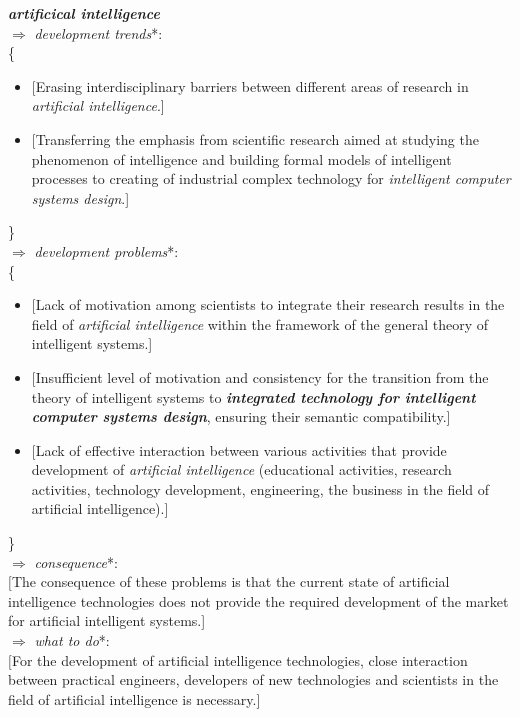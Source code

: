\documentclass[10pt, a4paper]{proc}
\begin{document}
 \noindent\textbf{\textit{artificical intelligence}}\\
 \(\Rightarrow\) \textit{development trends}*:\\
 \{
 \begin{itemize}
  \item \([\)Erasing interdisciplinary barriers between different areas of research in \textit{artificial intelligence}.]
  \item \([\)Transferring the emphasis from scientific research aimed at studying the phenomenon of intelligence and building formal models of intelligent processes to creating of industrial complex technology for \textit{intelligent computer systems design}.]
 \end{itemize}
 \}\\
 \(\Rightarrow\) \textit{development problems}*:\\
 \{
 \begin{itemize}
  \item \([\)Lack of motivation among scientists to integrate their research results in the field of \textit{artificial intelligence} within the framework of the general theory of intelligent systems.]
  \item \([\)Insufficient level of motivation and consistency for the transition from the theory of intelligent systems to \textbf{\textit{integrated technology for intelligent computer systems design}}, ensuring their semantic compatibility.]
  \item \([\)Lack of effective interaction between various activities that provide development of \textit{artificial intelligence} (educational activities, research activities, technology development, engineering, the business in the field of artificial intelligence).]
 \end{itemize}
 \}\\
 \(\Rightarrow\) \textit{consequence}*:\\
 \([\)The consequence of these problems is that the current state of artificial intelligence technologies does not provide the required development of the market for artificial intelligent systems.]\\
 \(\Rightarrow\) \textit{what to do}*:\\
 \([\)For the development of artificial intelligence technologies, close interaction between practical engineers, developers of new technologies and scientists in the field of artificial intelligence is necessary.]\\~\\
\end{document}
